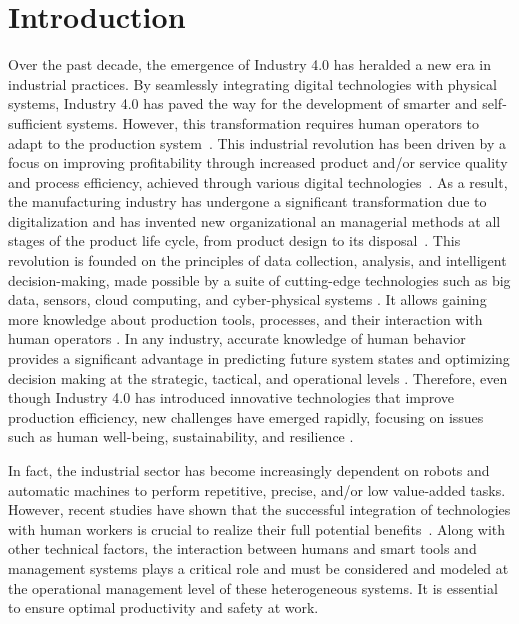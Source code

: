 \documentclass[review,12pt, 3p, times]{elsarticle}
\begin{document}



\section{Introduction}
Over the past decade, the emergence of Industry 4.0 has heralded a new era in industrial practices. By seamlessly integrating digital technologies with physical systems, Industry 4.0 has paved the way for the development of smarter and self-sufficient systems. However, this transformation requires human operators to adapt to the production system~\cite{lyngstadaas2022harder,fantini2020placing,pinzone2020framework}. This industrial revolution has been driven by a focus on improving profitability through increased product and/or service quality and process efficiency, achieved through various digital technologies~\cite{raja2023industry}. As a result, the manufacturing industry has undergone a significant transformation due to digitalization and has invented new organizational an managerial methods at all stages of the product life cycle, from product design to its disposal~\citep{messaadia2016plm}. This revolution is founded on the principles of data collection, analysis, and intelligent decision-making, made possible by a suite of cutting-edge technologies such as big data, sensors, cloud computing, and cyber-physical systems \citep{brik2022fog}. It allows gaining more knowledge about production tools, processes, and their interaction with human operators \cite{kadir2020human}. In any industry, accurate knowledge of human behavior provides a significant advantage in predicting future system states and optimizing decision making at the strategic, tactical, and operational levels \citep{bailly2020}. Therefore, even though Industry 4.0 has introduced innovative technologies that improve production efficiency, new challenges have emerged rapidly, focusing on issues such as human well-being, sustainability, and resilience \citep{lyngstadaas2022harder}.

In fact, the industrial sector has become increasingly dependent on robots and automatic machines to perform repetitive, precise, and/or low value-added tasks. However, recent studies have shown that the successful integration of technologies with human workers is crucial to realize their full potential benefits~\citep{chen2022analysis,kose2023game,dolgui2022design}. Along with other technical factors, the interaction between humans and smart tools and management systems plays a critical role and must be considered and modeled at the operational management level of these heterogeneous systems. It is essential to ensure optimal productivity and safety at work. 
\end{document}
